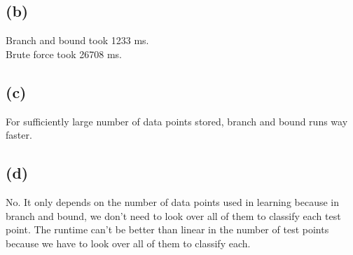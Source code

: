 \documentclass{article}
\begin{document}
	\subsection*{(b)}
		Branch and bound took 1233 ms.\\
		Brute force took 26708 ms.
	\subsection*{(c)}
		For sufficiently large number of data points stored, branch and bound runs way faster.
	\subsection*{(d)}
		No. It only depends on the number of data points used in learning because in branch and bound, we don't need to look over all of them to classify each test point. The runtime can't be better than linear in the number of test points because we have to look over all of them to classify each.
\end{document}
